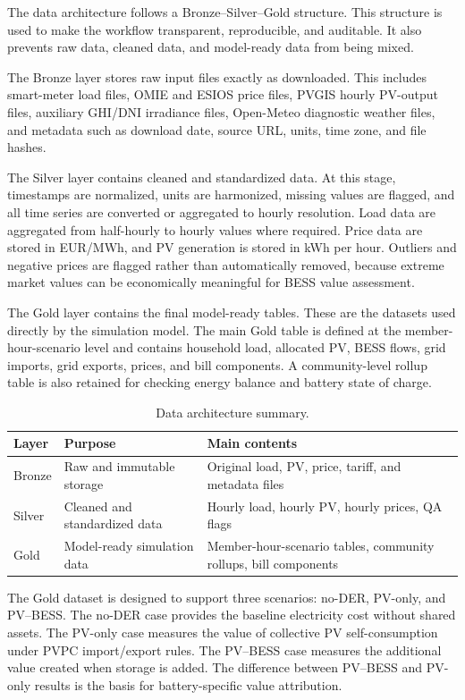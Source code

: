 The data architecture follows a Bronze--Silver--Gold structure. This structure is used to make the workflow transparent, reproducible, and auditable. It also prevents raw data, cleaned data, and model-ready data from being mixed.

The Bronze layer stores raw input files exactly as downloaded. This includes smart-meter load files, OMIE and ESIOS price files, PVGIS hourly PV-output files, auxiliary GHI/DNI irradiance files, Open-Meteo diagnostic weather files, and metadata such as download date, source URL, units, time zone, and file hashes.

The Silver layer contains cleaned and standardized data. At this stage, timestamps are normalized, units are harmonized, missing values are flagged, and all time series are converted or aggregated to hourly resolution. Load data are aggregated from half-hourly to hourly values where required. Price data are stored in EUR/MWh, and PV generation is stored in kWh per hour. Outliers and negative prices are flagged rather than automatically removed, because extreme market values can be economically meaningful for BESS value assessment.

The Gold layer contains the final model-ready tables. These are the datasets used directly by the simulation model. The main Gold table is defined at the member-hour-scenario level and contains household load, allocated PV, BESS flows, grid imports, grid exports, prices, and bill components. A community-level rollup table is also retained for checking energy balance and battery state of charge.

\begin{table}[htbp]
\centering
\caption{Data architecture summary.}
\label{tab:ch3_data_architecture_summary}
\begin{tabular}{p{}p{}p{}}
\toprule
\textbf{Layer} & \textbf{Purpose} & \textbf{Main contents} \\
\midrule
Bronze & Raw and immutable storage & Original load, PV, price, tariff, and metadata files \\
Silver & Cleaned and standardized data & Hourly load, hourly PV, hourly prices, QA flags \\
Gold & Model-ready simulation data & Member-hour-scenario tables, community rollups, bill components \\
\bottomrule
\end{tabular}
\end{table}

The Gold dataset is designed to support three scenarios: no-DER, PV-only, and PV--BESS. The no-DER case provides the baseline electricity cost without shared assets. The PV-only case measures the value of collective PV self-consumption under PVPC import/export rules. The PV--BESS case measures the additional value created when storage is added. The difference between PV--BESS and PV-only results is the basis for battery-specific value attribution.

